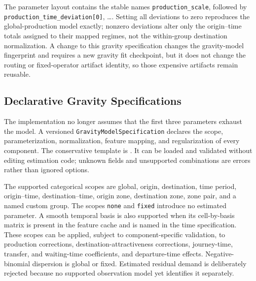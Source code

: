 The parameter layout contains the stable names
\texttt{production\_scale}, followed by
\texttt{production\_time\_deviation[0]}, \ldots .  Setting all deviations to
zero reproduces the global-production model exactly; nonzero deviations alter
only the origin--time totals assigned to their mapped regimes, not the
within-group destination normalization.  A change to this gravity
specification changes the gravity-model fingerprint and requires a new gravity
fit checkpoint, but it does not change the routing or fixed-operator artifact
identity, so those expensive artifacts remain reusable.

\subsection{Declarative Gravity Specifications}

The implementation no longer assumes that the first three parameters exhaust
the model. A versioned \texttt{GravityModelSpecification} declares the scope,
parameterization, normalization, feature mapping, and regularization of every
component. The conservative template is
. It can be loaded and validated
without editing estimation code; unknown fields and unsupported combinations
are errors rather than ignored options.

The supported categorical scopes are global, origin, destination, time period,
origin--time, destination--time, origin zone, destination zone, zone pair, and
a named custom group. The scopes \texttt{none} and \texttt{fixed} introduce no
estimated parameter. A smooth temporal basis is also supported when its
cell-by-basis matrix is present in the feature cache and is named in the time
specification. These scopes can be applied, subject to component-specific
validation, to production corrections, destination-attractiveness corrections,
journey-time, transfer, and waiting-time coefficients, and departure-time
effects. Negative-binomial dispersion is global or fixed. Estimated residual
demand is deliberately rejected because no supported observation model yet
identifies it separately.

